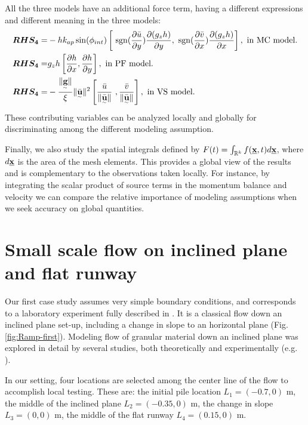\documentclass{article}
\begin{document}
All the three models have an additional force term, having a different expressions and different meaning in the three models:
\begin{align}
\boldsymbol{RHS_4} =&  - h k_{ap}\sin(\phi_{int})\left[ \ {\rm sgn}(\frac{\partial \bar{u}}{\partial y}) \frac{\partial (g_z h)}{\partial y},\ {\rm sgn}({\frac{\partial \bar{v}}{\partial x}}) \frac{\partial (g_z h)}{\partial x}\right],\textmd{ in MC model.}\nonumber\\
\boldsymbol{RHS_4} =& g_{z}h\left[\frac{\partial h}{\partial x}, \frac{\partial h}{\partial y}\right],\textmd{ in PF model.}\\
\boldsymbol{RHS_4} =& -\frac{\| \underset{^\sim}{\textbf g} \|}{\xi}\| \underset{^\sim}{\bar{\textbf u}} \|^2\left[\frac{\bar{u}}{\| \underset{^\sim}{\bar{\textbf u}}\|} \ ,\frac{\bar{v}}{\| \underset{^\sim}{\bar{\textbf u}}\|}\right],\textmd{ in VS model.}\nonumber
\end{align}
These contributing variables can be analyzed locally and globally for discriminating among the different modeling assumption.

Finally, we also study the spatial integrals defined by $F(t)=\int_{\mathbb R^k}f(\underline{\textbf x},t) d\underline{\textbf x}$, where $d\underline{\textbf x}$ is the area of the mesh elements. This provides a global view of the results and is complementary to the observations taken locally. For instance, by integrating the scalar product of source terms in the momentum balance and velocity we can compare the relative importance of modeling assumptions when we seek accuracy on global quantities.


\section{Small scale flow on inclined plane and flat runway}\label{sec:QoIs}
Our first case study assumes very simple boundary conditions, and corresponds to a laboratory experiment fully described in \citep{Webb2004, Bursik2005, WebbBursik2016}. It is a classical flow down an inclined plane set-up, including a change in slope to an horizontal plane (Fig. \ref{fig:Ramp-first}). Modeling flow of granular material down an inclined plane was explored in detail by several studies, both theoretically and experimentally (e.g. \cite{RuyerQuil2000, Silbert2001, Pitman2003b}).

In our setting, four locations are selected among the center line of the flow to accomplish local testing. These are: the initial pile location $L_1=(-0.7,0)$ m, the middle of the inclined plane $L_2=(-0.35,0)$ m, the change in slope $L_3=(0,0)$ m, the middle of the flat runway $L_4=(0.15,0)$ m.
\end{document}
